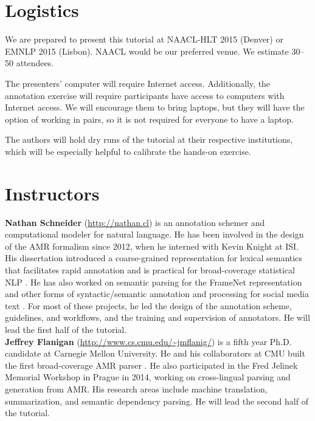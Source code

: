 \documentclass[11pt,letterpaper]{article}
\begin{document}
\section{Logistics}

We are prepared to present this tutorial at \mbox{NAACL-HLT} 2015 (Denver) or EMNLP 2015 (Lisbon). 
NAACL would be our preferred venue.
We estimate 30--50 attendees.

The presenters' computer will require Internet access.
Additionally, the annotation exercise will require participants have access to computers
with Internet access.
We will encourage them to bring laptops, but
they will have the option of working in pairs, so it is not required for everyone to have a laptop. 

The authors will hold dry runs of the tutorial at their respective institutions, 
which will be especially helpful to calibrate the hands-on exercise. 

\section{Instructors}

\textbf{Nathan Schneider} (\url{http://nathan.cl}) is an annotation schemer and computational modeler for natural language. 
He has been involved in the design of the AMR formalism since 2012, 
when he interned with Kevin Knight at ISI. 
His dissertation introduced a coarse-grained representation for lexical semantics that facilitates rapid annotation 
and is practical for broad-coverage statistical NLP \citep{schneider-thesis}. 
He has also worked on semantic parsing for the FrameNet representation \citep{das-14} 
and other forms of syntactic/semantic annotation and processing for social media text \citep{gimpel-11,owoputi-13,schneider-13,kong-14,mohit-12}.
For most of these projects, he led the design of the annotation scheme, guidelines, and workflows, 
and the training and supervision of annotators.
He will lead the first half of the tutorial.\\[-5pt]

\noindent \textbf{Jeffrey Flanigan} (\url{http://www.cs.cmu.edu/~jmflanig/}) is a fifth year Ph.D. candidate at Carnegie Mellon University.
He and his collaborators at CMU built the first broad-coverage AMR parser \citep{flanigan-14}.
He also participated in the Fred Jelinek Memorial Workshop in Prague in 2014, working on cross-lingual parsing and generation from AMR.
His research areas include machine translation, summarization, and semantic dependency parsing.
He will lead the second half of the tutorial.


\setlength{\bibsep}{1pt}
{\fontsize{10}{12.25}\selectfont
}
\end{document}
